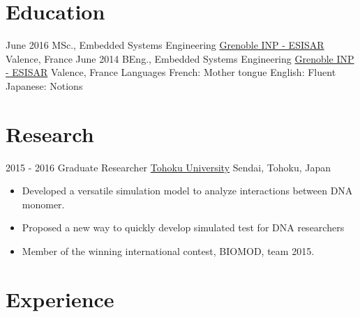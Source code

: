 \documentclass[a4paper]{template} %
\begin{document}
\makeprofile %

\section{Education}

\begin{twenty} %
	\twentyitem
    	{June 2016}
        {MSc., Embedded Systems Engineering}
        {\href{http://esisar.grenoble-inp.fr/}{Grenoble INP - ESISAR}}
        {Valence, France}
	\twentyitem
    	{June 2014}
        {BEng., Embedded Systems Engineering}
        {\href{http://esisar.grenoble-inp.fr/}{Grenoble INP - ESISAR}}
        {Valence, France}
	\twentyitem
    	{}
        {Languages}
        {French: Mother tongue}
				{English: Fluent}
				{Japanese: Notions}
\end{twenty}


\section{Research}
\begin{twenty}
	\twentyitem
    	{2015 - 2016}
        {Graduate Researcher}
        {\href{http://www.tohoku.ac.jp/en/}{Tohoku University}}
        {Sendai, Tohoku, Japan}
        {
        {\begin{itemize}
        \item Developed a versatile simulation model to analyze interactions between DNA monomer.
        \item Proposed a new way to quickly develop simulated test for DNA researchers
        \item Member of the winning international contest, BIOMOD, team 2015.
    \end{itemize}}
        }
\end{twenty}


\section{Experience}
\end{document}
